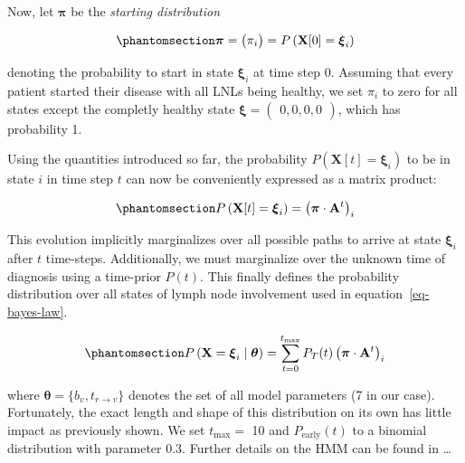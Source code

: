 \documentclass[11pt,twocolumn,twoside]{article}
\begin{document}
Now, let \(\boldsymbol{\pi}\) be the \emph{starting distribution}

\begin{equation}\phantomsection\label{eq-starting-distribution}{
\boldsymbol{\pi} = \begin{pmatrix} \pi_i \end{pmatrix} = P \left( \mathbf{X}[0] = \boldsymbol{\xi}_i \right)
}\end{equation}

denoting the probability to start in state \(\boldsymbol{\xi}_i\) at
time step 0. Assuming that every patient started their disease with all
LNLs being healthy, we set \(\pi_i\) to zero for all states except the
completly healthy state
\(\boldsymbol{\xi} = \begin{pmatrix} 0, 0, 0, 0 \end{pmatrix}\), which
has probability 1.

Using the quantities introduced so far, the probability
\(P \left( \mathbf{X}[t]=\boldsymbol{\xi}_i \right)\) to be in state
\(i\) in time step \(t\) can now be conveniently expressed as a matrix
product:

\begin{equation}\phantomsection\label{eq-evolution}{
P \left( \mathbf{X}[t]=\boldsymbol{\xi}_i \right) = \left( \boldsymbol{\pi} \cdot \mathbf{A}^t \right)_i
}\end{equation}

This evolution implicitly marginalizes over all possible paths to arrive
at state \(\boldsymbol{\xi}_i\) after \(t\) time-steps. Additionally, we
must marginalize over the unknown time of diagnosis using a time-prior
\(P(t)\). This finally defines the probability distribution over all
states of lymph node involvement used in equation~\ref{eq-bayes-law}.

\begin{equation}\phantomsection\label{eq-marginalized-evolution}{
P \left( \mathbf{X}=\boldsymbol{\xi}_i \mid \boldsymbol{\theta} \right) = \sum_{t=0}^{t_\text{max}} P_T(t) \left( \boldsymbol{\pi} \cdot \mathbf{A}^t \right)_i
}\end{equation}

where \(\boldsymbol{\theta}=\{ b_v, t_{r \rightarrow v} \}\) denotes the
set of all model parameters (7 in our case). Fortunately, the exact
length and shape of this distribution on its own has little impact as
previously shown. We set \(t_\text{max}=\) 10 and \(P_\text{early}(t)\)
to a binomial distribution with parameter 0.3. Further details on the
HMM can be found in \ldots{}
\end{document}
